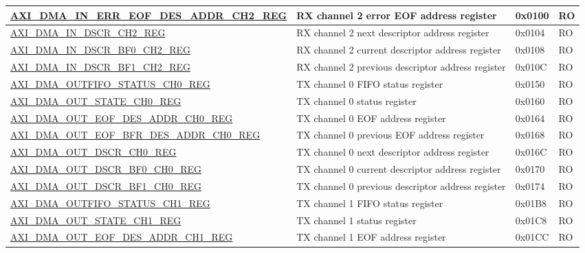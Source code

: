 \begin{longtable}{ | l | p{10cm} | p{1.3cm} | l | }
\hyperref[regdesc:AXIDMAINERREOFDESADDRCHNREG]{AXI\_DMA\_IN\_ERR\_EOF\_DES\_ADDR\_CH2\_REG} & RX channel 2 error EOF address register & 0x0100 & RO \\ \hline
\hyperref[regdesc:AXIDMAINDSCRCHNREG]{AXI\_DMA\_IN\_DSCR\_CH2\_REG} & RX channel 2 next descriptor address register & 0x0104 & RO \\ \hline
\hyperref[regdesc:AXIDMAINDSCRBF0CHNREG]{AXI\_DMA\_IN\_DSCR\_BF0\_CH2\_REG} & RX channel 2 current descriptor address register & 0x0108 & RO \\ \hline
\hyperref[regdesc:AXIDMAINDSCRBF1CHNREG]{AXI\_DMA\_IN\_DSCR\_BF1\_CH2\_REG} & RX channel 2 previous descriptor address register & 0x010C & RO \\ \hline
\hyperref[regdesc:AXIDMAOUTFIFOSTATUSCHNREG]{AXI\_DMA\_OUTFIFO\_STATUS\_CH0\_REG} & TX channel 0 FIFO status register & 0x0150 & RO \\ \hline
\hyperref[regdesc:AXIDMAOUTSTATECHNREG]{AXI\_DMA\_OUT\_STATE\_CH0\_REG} & TX channel 0 status register & 0x0160 & RO \\ \hline
\hyperref[regdesc:AXIDMAOUTEOFDESADDRCHNREG]{AXI\_DMA\_OUT\_EOF\_DES\_ADDR\_CH0\_REG} & TX channel 0 EOF address register & 0x0164 & RO \\ \hline
\hyperref[regdesc:AXIDMAOUTEOFBFRDESADDRCHNREG]{AXI\_DMA\_OUT\_EOF\_BFR\_DES\_ADDR\_CH0\_REG} & TX channel 0 previous EOF address register & 0x0168 & RO \\ \hline
\hyperref[regdesc:AXIDMAOUTDSCRCHNREG]{AXI\_DMA\_OUT\_DSCR\_CH0\_REG} & TX channel 0 next descriptor address register & 0x016C & RO \\ \hline
\hyperref[regdesc:AXIDMAOUTDSCRBF0CHNREG]{AXI\_DMA\_OUT\_DSCR\_BF0\_CH0\_REG} & TX channel 0 current descriptor address register & 0x0170 & RO \\ \hline
\hyperref[regdesc:AXIDMAOUTDSCRBF1CHNREG]{AXI\_DMA\_OUT\_DSCR\_BF1\_CH0\_REG} & TX channel 0 previous descriptor address register & 0x0174 & RO \\ \hline
\hyperref[regdesc:AXIDMAOUTFIFOSTATUSCHNREG]{AXI\_DMA\_OUTFIFO\_STATUS\_CH1\_REG} & TX channel 1 FIFO status register & 0x01B8 & RO \\ \hline
\hyperref[regdesc:AXIDMAOUTSTATECHNREG]{AXI\_DMA\_OUT\_STATE\_CH1\_REG} & TX channel 1 status register & 0x01C8 & RO \\ \hline
\hyperref[regdesc:AXIDMAOUTEOFDESADDRCHNREG]{AXI\_DMA\_OUT\_EOF\_DES\_ADDR\_CH1\_REG} & TX channel 1 EOF address register & 0x01CC & RO \\ \hline

\end{longtable}
